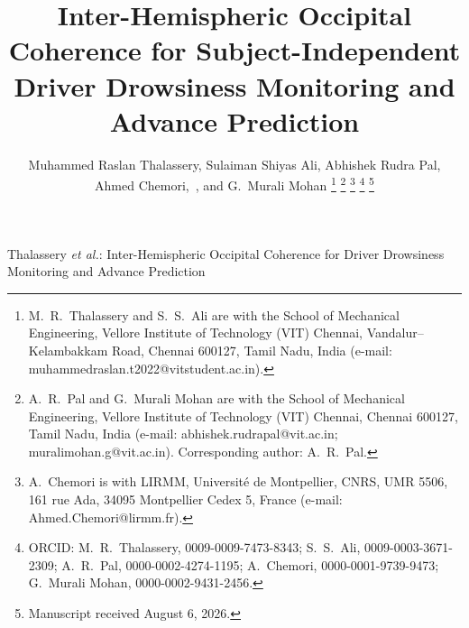 \documentclass[journal]{IEEEtran}
\DeclareRobustCommand{\add}[1]{#1}                         %
\DeclareRobustCommand{\del}[1]{}                           %
\DeclareRobustCommand{\add}[1]{\hl{#1}}
\DeclareRobustCommand{\del}[1]{{\color{delred}\sout{#1}}\,}
\DeclareRobustCommand{\del}[1]{}                         %
\DeclareRobustCommand{\chg}[2]{\del{#1}\add{#2}}
\begin{document}
\title{\chg{Pro-Active Driver Drowsiness Monitoring Using Two-Channel Occipital EEG}{Inter-Hemispheric Occipital Coherence for Subject-Independent Driver Drowsiness Monitoring and Advance Prediction}}

\author{
    Muhammed Raslan Thalassery,
    Sulaiman Shiyas Ali,
    \chg{Abhishek Rudra Pal,~\IEEEmembership{Member,~IEEE},}{Abhishek Rudra Pal,}
    \add{Ahmed Chemori,~,}
    and G.~Murali Mohan
\thanks{M.~R.~Thalassery and S.~S.~Ali are with the School of Mechanical Engineering, Vellore Institute of Technology (VIT) Chennai, Vandalur--Kelambakkam Road, Chennai 600127, Tamil Nadu, India (e-mail: muhammedraslan.t2022@vitstudent.ac.in).}
\thanks{A.~R.~Pal and G.~Murali Mohan are with the School of Mechanical Engineering, Vellore Institute of Technology (VIT) Chennai, Chennai 600127, Tamil Nadu, India (e-mail: abhishek.rudrapal@vit.ac.in; muralimohan.g@vit.ac.in). Corresponding author: A.~R.~Pal.}
\thanks{\add{A.~Chemori is with LIRMM, Universit\'e de Montpellier, CNRS, UMR 5506, 161 rue Ada, 34095 Montpellier Cedex 5, France (e-mail: Ahmed.Chemori@lirmm.fr).}}
\thanks{\add{ORCID: M.~R.~Thalassery, 0009-0009-7473-8343; S.~S.~Ali, 0009-0003-3671-2309; A.~R.~Pal, 0000-0002-4274-1195; A.~Chemori, 0000-0001-9739-9473; G.~Murali Mohan, 0000-0002-9431-2456.}}
\thanks{Manuscript received August 6, 2026.}
}

{Thalassery \MakeLowercase{\textit{et al.}}: Inter-Hemispheric Occipital Coherence for Driver Drowsiness Monitoring and Advance Prediction}

\maketitle
\end{document}
